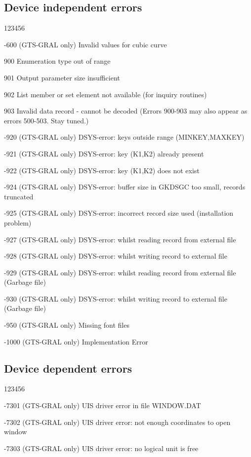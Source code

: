 \subsection{Device independent errors}
\begin{DLtt}{123456}
\item[-600]
(GTS-GRAL only) Invalid values for cubic curve
\item[900]
Enumeration type out of range
\item[901]
Output parameter size insufficient
\item[902]
List member or set element not available (for inquiry routines)
\item[903]
Invalid data record - cannot be decoded
(Errors 900-903 may also appear as errors 500-503. Stay tuned.)
\item[-920]
(GTS-GRAL only) DSYS-error: keys outside range (MINKEY,MAXKEY)
\item[-921]
(GTS-GRAL only) DSYS-error: key (K1,K2) already present
\item[-922]
(GTS-GRAL only) DSYS-error: key (K1,K2) does not exist
\item[-924]
(GTS-GRAL only) DSYS-error: buffer size in GKDSGC too small,
records truncated
\item[-925]
(GTS-GRAL only) DSYS-error: incorrect record size used
(installation problem)
\item[-927]
(GTS-GRAL only) DSYS-error: whilst reading record from external file
\item[-928]
(GTS-GRAL only) DSYS-error: whilst writing record to external file
\item[-929]
(GTS-GRAL only) DSYS-error: whilst reading record from external file
(Garbage file)
\item[-930]
(GTS-GRAL only) DSYS-error: whilst writing record to external file
(Garbage file)
\item[-950]
(GTS-GRAL only) Missing font files
\item[-1000]
(GTS-GRAL only) Implementation Error
\end{DLtt}
\subsection{Device dependent errors}
\begin{DLtt}{123456}
\item[-7301]
(GTS-GRAL only) UIS driver error in file WINDOW.DAT
\item[-7302]
(GTS-GRAL only) UIS driver error: not enough coordinates to open window
\item[-7303]
(GTS-GRAL only) UIS driver error: no logical unit is free
\end{DLtt}
 
